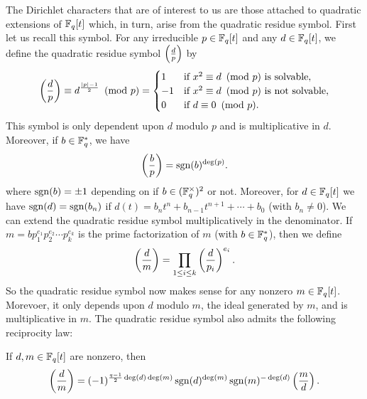 \documentclass[12pt,reqno,oneside]{amsart}
\begin{document}
    The Dirichlet characters that are of interest to us are those attached to quadratic extensions of $\mathbb{F}_{q}[t]$ which, in turn, arise from the quadratic residue symbol. First let us recall this symbol. For any irreducible $p \in \mathbb{F}_{q}[t]$ and any $d \in \mathbb{F}_{q}[t]$, we define the quadratic residue symbol $\textstyle{\left(\frac{d}{p}\right)}$ by
    \[
        \left(\frac{d}{p}\right) \equiv d^{\frac{|p|-1}{2}} \ \left(\text{mod }p\right) = \begin{cases} 1 & \text{if $x^{2} \equiv d \ \left(\text{mod }p\right)$ is solvable}, \\ -1 & \text{if $x^{2} \equiv d \ \left(\text{mod }p\right)$ is not solvable}, \\ 0 & \text{if $d \equiv 0 \ \left(\text{mod }p\right)$}. \end{cases}
    \]
    This symbol is only dependent upon $d$ modulo $p$ and is multiplicative in $d$. Moreover, if $b \in \mathbb{F}_{q}^{\ast}$, we have
    \[
        \left(\frac{b}{p}\right) = \operatorname{\mathrm{sgn}}(b)^{\deg(p)}.
    \]
    where $\operatorname{\mathrm{sgn}}(b) = \pm1$ depending on if $b \in (\mathbb{F}_{q}^{\times})^{2}$ or not. Moreover, for $d \in \mathbb{F}_{q}[t]$ we have $\operatorname{\mathrm{sgn}}(d) = \operatorname{\mathrm{sgn}}(b_{n})$ if $d(t) = b_{n}t^{n}+b_{n-1}t^{n+1}+\cdots+b_{0}$ (with $b_{n} \neq 0$). We can extend the quadratic residue symbol multiplicatively in the denominator. If $m = bp_{1}^{e_{1}}p_{2}^{e_{2}} \cdots p_{k}^{e_{k}}$ is the prime factorization of $m$ (with $b \in \mathbb{F}_{q}^{\ast}$), then we define
    \[
        \left(\frac{d}{m}\right) = \prod_{1 \le i \le k}\left(\frac{d}{p_{i}}\right)^{e_{i}}.
    \]
    So the quadratic residue symbol now makes sense for any nonzero $m \in \mathbb{F}_{q}[t]$. Morevoer, it only depends upon $d$ modulo $m$, the ideal generated by $m$, and is multiplicative in $m$. The quadratic residue symbol also admits the following reciprocity law:

    \begin{theorem}
        If $d,m \in \mathbb{F}_{q}[t]$ are nonzero, then
        \[
            \left(\frac{d}{m}\right) = (-1)^{\frac{q-1}{2}\deg(d)\deg(m)}\operatorname{\mathrm{sgn}}(d)^{\deg(m)}\operatorname{\mathrm{sgn}}(m)^{-\deg(d)}\left(\frac{m}{d}\right).
        \]
    \end{theorem}
\end{document}
